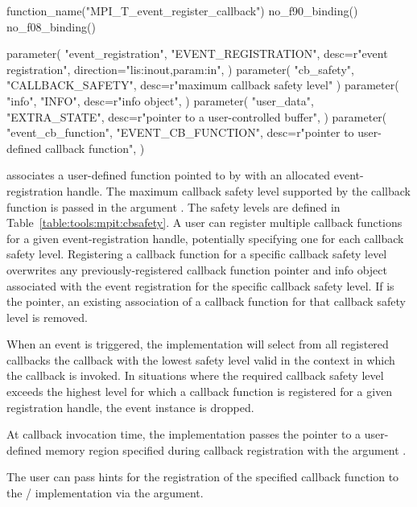 \begin{mpi-binding}
    function_name("MPI_T_event_register_callback")
    no_f90_binding()
    no_f08_binding()

    parameter(
        "event_registration",
        "EVENT_REGISTRATION",
        desc=r"event registration",
        direction="lis:inout,param:in",
    )
    parameter(
        "cb_safety",
        "CALLBACK_SAFETY",
        desc=r"maximum callback safety level"
    )
    parameter(
        "info",
        "INFO",
        desc=r"info object",
    )
    parameter(
        "user_data",
        "EXTRA_STATE",
        desc=r"pointer to a user-controlled buffer",
    )
    parameter(
        "event_cb_function",
        "EVENT_CB_FUNCTION",
        desc=r"pointer to user-defined callback function",
    )
\end{mpi-binding}

 associates a user-defined
function pointed to by  with an
allocated event-registration handle.
The maximum callback safety level supported
by the callback function is passed in the argument .  
The safety levels are defined in Table~\ref{table:tools:mpit:cbsafety}.
A user can
register multiple callback functions for a given event-registration handle, potentially
specifying one for each callback safety level. 
Registering a callback function for a specific callback safety level
overwrites any previously-registered callback function pointer and info
object associated with the event
registration for the specific callback safety level. If
 is the  pointer, an existing association
of a callback function for that callback safety level is removed.

When an event is triggered, the implementation will select from all registered callbacks
the callback with the lowest safety level valid in the context in which the callback
is invoked.  In situations where the required callback
safety level exceeds the highest level for which a callback function is 
registered for a given registration handle, the event instance is dropped.  

At callback invocation time, the implementation passes the pointer to a user-defined memory region specified during
callback registration with the argument .

The user can pass hints for
the registration of the specified callback function to the \MPI/ implementation via the 
argument.

